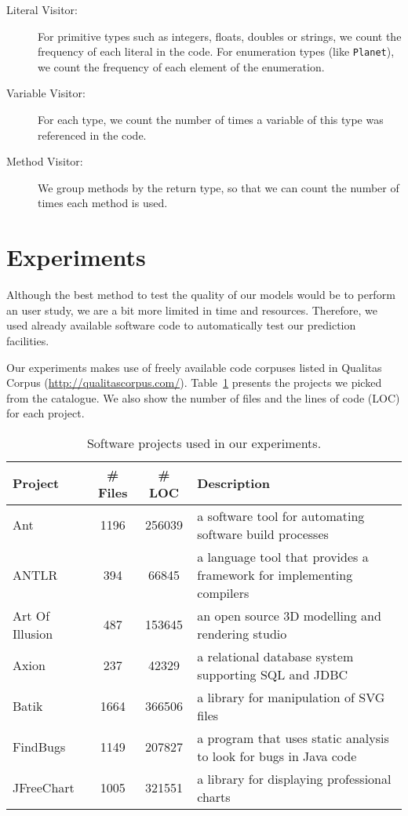 \documentclass{article} %
\begin{document}
\begin{description}
   \item[Literal Visitor:] For primitive types such as integers, floats, doubles or strings, we count the frequency of each literal in the code. For enumeration types (like \texttt{Planet}), we count the frequency of each element of the enumeration.

   \item[Variable Visitor:] For each type, we count the number of times a variable of this type was referenced in the code.

   \item[Method Visitor:] We group methods by the return type, so that we can count the number of times each method is used.
\end{description}

\section*{Experiments}

Although the best method to test the quality of our models would be to perform an user study, we are a bit more limited in time and resources. Therefore, we used already available software code to automatically test our prediction facilities.

Our experiments makes use of freely available code corpuses listed in Qualitas Corpus (\url{http://qualitascorpus.com/}).
Table~\ref{tab:projects} presents the projects we picked from the catalogue. We also show the number of files and the
lines of code (LOC) for each project.

\begin{table}[ht]
\centering
\begin{tabular}{|l|c|c|l|}
\hline
\textbf{Project} & \textbf{\# Files} & \textbf{\# LOC} & \textbf{Description} \\
\hline
Ant & 1196 & 256039 & a software tool for automating software build processes \\
ANTLR & 394 & 66845 & a language tool that provides a framework for implementing compilers \\
Art Of Illusion & 487 & 153645 & an open source 3D modelling and rendering studio \\
Axion & 237 & 42329 & a relational database system supporting SQL and JDBC \\
Batik & 1664 & 366506 & a library for manipulation of SVG files \\
FindBugs & 1149 & 207827 & a program that uses static analysis to look for bugs in Java code \\
JFreeChart & 1005 & 321551 & a library for displaying professional charts \\
\hline
\end{tabular}
\caption{Software projects used in our experiments.}
\label{tab:projects}
\end{table}
\end{document}
